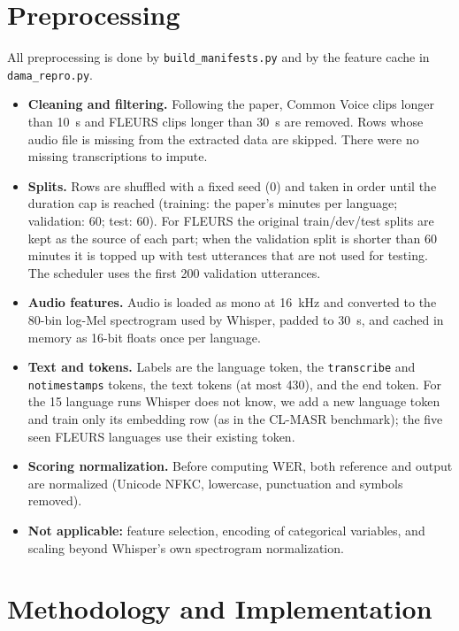 \documentclass[11pt,a4paper]{article}
\begin{document}
\section{Preprocessing}
All preprocessing is done by \texttt{build\_manifests.py} and by the feature cache in \texttt{dama\_repro.py}.
\begin{itemize}
\item \textbf{Cleaning and filtering.} Following the paper, Common Voice clips longer than 10~s and FLEURS clips longer than 30~s are removed. Rows whose audio file is missing from the extracted data are skipped. There were no missing transcriptions to impute.
\item \textbf{Splits.} Rows are shuffled with a fixed seed (0) and taken in order until the duration cap is reached (training: the paper's minutes per language; validation: 60; test: 60). For FLEURS the original train/dev/test splits are kept as the source of each part; when the validation split is shorter than 60 minutes it is topped up with test utterances that are not used for testing. The scheduler uses the first 200 validation utterances.
\item \textbf{Audio features.} Audio is loaded as mono at 16~kHz and converted to the 80-bin log-Mel spectrogram used by Whisper, padded to 30~s, and cached in memory as 16-bit floats once per language.
\item \textbf{Text and tokens.} Labels are the language token, the \texttt{transcribe} and \texttt{notimestamps} tokens, the text tokens (at most 430), and the end token. For the 15 language runs Whisper does not know, we add a new language token and train only its embedding row (as in the CL-MASR benchmark); the five seen FLEURS languages use their existing token.
\item \textbf{Scoring normalization.} Before computing WER, both reference and output are normalized (Unicode NFKC, lowercase, punctuation and symbols removed).
\item \textbf{Not applicable:} feature selection, encoding of categorical variables, and scaling beyond Whisper's own spectrogram normalization.
\end{itemize}

\section{Methodology and Implementation}
\end{document}
